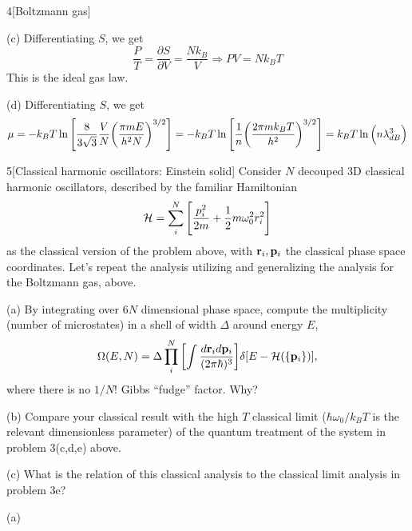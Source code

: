 \documentclass[12pt]{article}
\begin{document}
\begin{problem}{4}[Boltzmann gas]
\begin{solution}
(c) Differentiating $S$, we get
\begin{equation}
    \frac{P}{T}=\frac{\partial S}{\partial V}=\frac{Nk_B}{V} 
    \Rightarrow PV=Nk_BT
\end{equation}
This is the ideal gas law.

(d) Differentiating $S$, we get
\begin{equation}
    \mu=-k_BT\ln\qty[\frac8{3\sqrt3}\frac{V}{N}\qty(\frac{\pi mE}{h^2N})^{3/2}]
    =-k_BT\ln\qty[\frac{1}{n}\qty(\frac{2\pi mk_BT}{h^2})^{3/2}]
    =k_BT\ln\qty(n\lambda_{dB}^3)
\end{equation}
\end{solution}
\end{problem}
\begin{problem}{5}[Classical harmonic oscillators: Einstein solid]
Consider $N$ decouped 3D classical harmonic oscillators, described by the
familiar Hamiltonian
\begin{equation}
    \mathcal{H}=\sum_i^N\qty[\frac{p_i^2}{2m}+\frac12m\omega_0^2r_i^2] 
\end{equation}
as the classical version of the problem above, with $\vb{r}_i,\vb{p}_i$ the
classical phase space coordinates. Let's repeat the analysis utilizing and
generalizing the analysis for the Boltzmann gas, above.

(a) By integrating over $6N$ dimensional phase space, compute the multiplicity
(number of microstates) in a shell of width $\Delta$ around energy $E$,
\begin{equation}
    \Omega(E,N)=\Delta\prod_i^N\qty[\int\frac{d\vb{r}_id\vb{p}_i}{(2\pi\hbar)^3}]\delta[E-\mathcal{H}(\qty{\vb{p}_i})],
\end{equation}
where there is no $1/N!$ Gibbs ``fudge'' factor. Why?

(b) Compare your classical result with the high $T$ classical limit
($\hbar\omega_0/k_BT$ is the relevant dimensionless parameter) of the quantum
treatment of the system in problem 3(c,d,e) above.

(c) What is the relation of this classical analysis to the classical limit
analysis in problem 3e?
\begin{solution}
(a)
\end{solution}
\end{problem}
    
\end{document}
